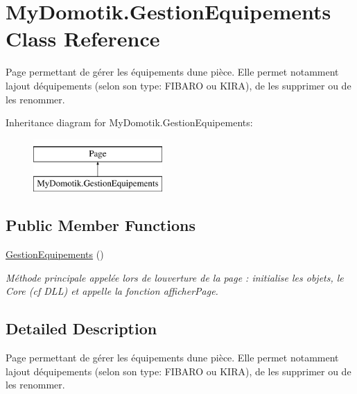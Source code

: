 \hypertarget{class_my_domotik_1_1_gestion_equipements}{}\section{My\+Domotik.\+Gestion\+Equipements Class Reference}
\label{class_my_domotik_1_1_gestion_equipements}


Page permettant de gérer les équipements d\textquotesingle{}une pièce. Elle permet notamment l\textquotesingle{}ajout d\textquotesingle{}équipements (selon son type\+: F\+I\+B\+A\+RO ou K\+I\+RA), de les supprimer ou de les renommer.  


Inheritance diagram for My\+Domotik.\+Gestion\+Equipements\+:\begin{figure}[H]
\begin{center}
\leavevmode
\includegraphics[height=2.000000cm]{class_my_domotik_1_1_gestion_equipements}
\end{center}
\end{figure}
\subsection*{Public Member Functions}
\begin{DoxyCompactItemize}
\item 
\hyperlink{class_my_domotik_1_1_gestion_equipements_a8f0c0227eabb6ef595b129c292a833d9}{Gestion\+Equipements} ()
\begin{DoxyCompactList}\small\item\em Méthode principale appelée lors de l\textquotesingle{}ouverture de la page \+: initialise les objets, le Core (cf D\+LL) et appelle la fonction afficher\+Page. \end{DoxyCompactList}\end{DoxyCompactItemize}


\subsection{Detailed Description}
Page permettant de gérer les équipements d\textquotesingle{}une pièce. Elle permet notamment l\textquotesingle{}ajout d\textquotesingle{}équipements (selon son type\+: F\+I\+B\+A\+RO ou K\+I\+RA), de les supprimer ou de les renommer. 



